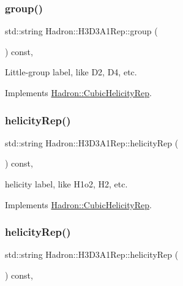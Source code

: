 \subsubsection{\texorpdfstring{group()}{group()}\hspace{0.1cm}{\footnotesize\ttfamily [5/5]}}
{\footnotesize\ttfamily std\+::string Hadron\+::\+H3\+D3\+A1\+Rep\+::group (\begin{DoxyParamCaption}{ }\end{DoxyParamCaption}) const\hspace{0.3cm}{\ttfamily [inline]}, {\ttfamily [virtual]}}

Little-\/group label, like D2, D4, etc. 

Implements \mbox{\hyperlink{structHadron_1_1CubicHelicityRep_a101a7d76cd8ccdad0f272db44b766113}{Hadron\+::\+Cubic\+Helicity\+Rep}}.

\mbox{\label{structHadron_1_1H3D3A1Rep_a70ba9574e123f458fa29aae49a92f425}} 
\subsubsection{\texorpdfstring{helicityRep()}{helicityRep()}\hspace{0.1cm}{\footnotesize\ttfamily [1/3]}}
{\footnotesize\ttfamily std\+::string Hadron\+::\+H3\+D3\+A1\+Rep\+::helicity\+Rep (\begin{DoxyParamCaption}{ }\end{DoxyParamCaption}) const\hspace{0.3cm}{\ttfamily [inline]}, {\ttfamily [virtual]}}

helicity label, like H1o2, H2, etc. 

Implements \mbox{\hyperlink{structHadron_1_1CubicHelicityRep_af1096946b7470edf0a55451cc662f231}{Hadron\+::\+Cubic\+Helicity\+Rep}}.

\mbox{\label{structHadron_1_1H3D3A1Rep_a70ba9574e123f458fa29aae49a92f425}} 
\subsubsection{\texorpdfstring{helicityRep()}{helicityRep()}\hspace{0.1cm}{\footnotesize\ttfamily [2/3]}}
{\footnotesize\ttfamily std\+::string Hadron\+::\+H3\+D3\+A1\+Rep\+::helicity\+Rep (\begin{DoxyParamCaption}{ }\end{DoxyParamCaption}) const\hspace{0.3cm}{\ttfamily [inline]}, {\ttfamily [virtual]}}

